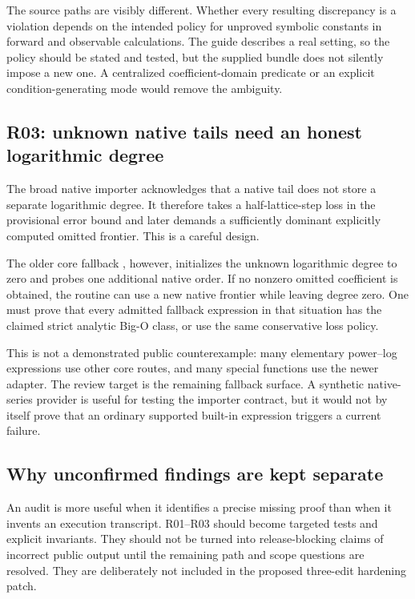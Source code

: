 \documentclass[11pt,letterpaper]{article}
\newcommand{\code}[1]{\texttt{\detokenize{#1}}}
\begin{document}
The source paths are visibly different. Whether every resulting discrepancy is a violation depends on the intended policy for unproved symbolic constants in forward and observable calculations. The guide describes a real setting, so the policy should be stated and tested, but the supplied bundle does not silently impose a new one. A centralized coefficient-domain predicate or an explicit condition-generating mode would remove the ambiguity.

\subsection{R03: unknown native tails need an honest logarithmic degree}
The broad native importer acknowledges that a native \code{SeriesData} tail does not store a separate logarithmic degree. It therefore takes a half-lattice-step loss in the provisional error bound and later demands a sufficiently dominant explicitly computed omitted frontier. This is a careful design.\cite{native}

The older core fallback \code{fwdSeries}, however, initializes the unknown logarithmic degree to zero and probes one additional native order. If no nonzero omitted coefficient is obtained, the routine can use a new native frontier while leaving degree zero. One must prove that every admitted fallback expression in that situation has the claimed strict analytic Big-O class, or use the same conservative loss policy.\cite[lines 452--489]{core}

This is not a demonstrated public counterexample: many elementary power--log expressions use other core routes, and many special functions use the newer adapter. The review target is the remaining fallback surface. A synthetic native-series provider is useful for testing the importer contract, but it would not by itself prove that an ordinary supported built-in expression triggers a current failure.

\subsection{Why unconfirmed findings are kept separate}
An audit is more useful when it identifies a precise missing proof than when it invents an execution transcript. R01--R03 should become targeted tests and explicit invariants. They should not be turned into release-blocking claims of incorrect public output until the remaining path and scope questions are resolved. They are deliberately not included in the proposed three-edit hardening patch.
\end{document}
